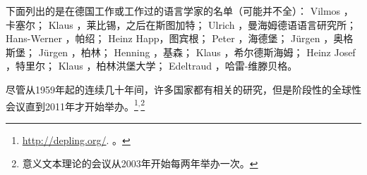下面列出的是在德国工作或工作过的语言学家的名单（可能并不全）：
Vilmos  \citet{Agel2000a-u}，卡塞尔；
Klaus  \citet{Baumgaertner65a-u,Baumgaertner70a}，莱比锡，之后在斯图加特；
Ulrich  \citet{Engel77,Engel2014a}，曼海姆德语语言研究所； 
Hans-Werner  \citet{Eroms85a,Eroms87b-u,Eroms2000a}，帕绍； 
Heinz Happ，图宾根；
Peter  \citet{Hellwig78a-u,Hellwig2003a}，海德堡；
Jürgen  \citet{Heringer96a-u}，奥格斯堡； 
Jürgen  \citet{Kunze68a-u,Kunze75a-u}，柏林；
Henning  \citet{Lobin93a-u}，基森；
Klaus  \citet{Schubert87a-u}，希尔德斯海姆；
Heinz Josef  \citet{Weber97a}，特里尔；
Klaus  \citet{Welke88a-u,Welke2011a-u}，柏林洪堡大学；
Edeltraud  \citet{Werner93a-u}，哈雷-维滕贝格。

尽管从1959年起的连续几十年间，许多国家都有相关的研究，但是阶段性的全球性会议直到2011年才开始举办。\footnote{%
  \href{http://depling.org/}{http://depling.org/}. 。
}$^,$\footnote{%
  意义文本理论的会议从2003年开始每两年举办一次。
}

